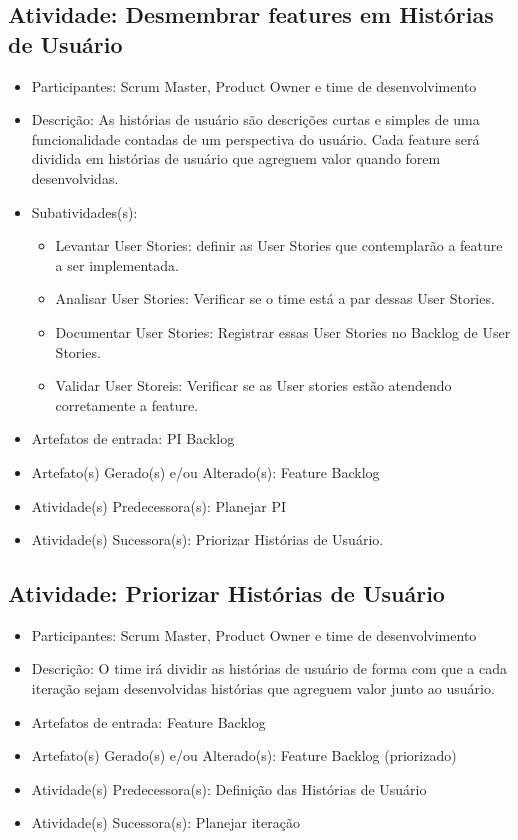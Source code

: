 \subsection{Atividade: Desmembrar features em Histórias de Usuário}
\begin{itemize}
\item Participantes: Scrum Master, Product Owner e time de desenvolvimento

\item Descrição: As histórias de usuário são descrições curtas e simples de uma funcionalidade contadas de um perspectiva do usuário. Cada feature será dividida em histórias de usuário que agreguem valor quando forem desenvolvidas.

\item Subatividades(s):
\begin{itemize} 
\item Levantar User Stories: definir as User Stories que contemplarão a feature a ser implementada.
\item Analisar User Stories: Verificar se o time está a par dessas User Stories.
\item Documentar User Stories:  Registrar essas User Stories no Backlog de User Stories.
\item Validar User Storeis: Verificar se as User stories estão atendendo corretamente a feature.
\end{itemize}

\item Artefatos de entrada: PI Backlog

\item Artefato(s) Gerado(s) e/ou Alterado(s): Feature Backlog

\item Atividade(s) Predecessora(s): Planejar PI
  
\item Atividade(s) Sucessora(s): Priorizar Histórias de Usuário.
\end{itemize}

\subsection{Atividade: Priorizar Histórias de Usuário}
\begin{itemize}
\item Participantes: Scrum Master, Product Owner e time de desenvolvimento

\item Descrição: O time irá dividir as histórias de usuário de forma com que a cada iteração sejam desenvolvidas histórias que agreguem valor junto ao usuário. 

\item Artefatos de entrada: Feature Backlog

\item Artefato(s) Gerado(s) e/ou Alterado(s): Feature Backlog (priorizado)

\item Atividade(s) Predecessora(s): Definição das Histórias de Usuário
  
\item Atividade(s) Sucessora(s): Planejar iteração
\end{itemize}

